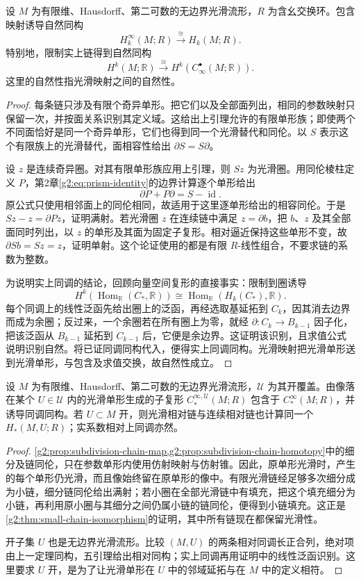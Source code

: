 \begin{theorem}\label{g2:thm:smooth-singular-comparison}
	设 \(M\) 为有限维、Hausdorff、第二可数的无边界光滑流形，\(R\) 为含幺交换环。包含映射诱导自然同构
	\[
		H_k^\infty(M;R)\xrightarrow{\ \cong\ }H_k(M;R).
	\]
	特别地，限制实上链得到自然同构
	\[
		H^k(M;\mathbb R)\xrightarrow{\ \cong\ }H^k(C_\infty^\bullet(M;\mathbb R)).
	\]
	这里的自然性指光滑映射之间的自然性。
\end{theorem}
\begin{proof}
	每条链只涉及有限个奇异单形。把它们以及全部面列出，相同的参数映射只保留一次，并按面关系识别其定义域。这给出上引理允许的有限单形族；即使两个不同面恰好是同一个奇异单形，它们也得到同一个光滑替代和同伦。以 \(S\) 表示这个有限族上的光滑替代，面相容性给出 \(\partial S=S\partial\)。

	设 \(z\) 是连续奇异圈。对其有限单形族应用上引理，则 \(Sz\) 为光滑圈。用同伦棱柱定义 \(P\)，第2章\cref{g2:eq:prism-identity}的边界计算逐个单形给出
	\[
		\partial P+P\partial=S-\operatorname{id}.
	\]
	原公式只使用相邻面上的同伦相同，故适用于这里逐单形给出的相容同伦。于是 \(Sz-z=\partial Pz\)，证明满射。若光滑圈 \(z\) 在连续链中满足 \(z=\partial b\)，把 \(b\)、\(z\) 及其全部面同时列出，以 \(z\) 的单形及其面为固定子复形。相对逼近保持这些单形不变，故 \(\partial Sb=Sz=z\)，证明单射。这个论证使用的都是有限 \(R\)-线性组合，不要求链的系数为整数。

	为说明实上同调的结论，回顾向量空间复形的直接事实：限制到圈诱导
	\[
		H^k(\operatorname{Hom}_{\mathbb R}(C_*,\mathbb R))
		\cong\operatorname{Hom}_{\mathbb R}(H_k(C_*),\mathbb R).
	\]
	每个同调上的线性泛函先给出圈上的泛函，再经选取基延拓到 \(C_k\)，因其消去边界而成为余圈；反过来，一个余圈若在所有圈上为零，就经 \(\partial:C_k\to B_{k-1}\) 因子化，把该泛函从 \(B_{k-1}\) 延拓到 \(C_{k-1}\) 后，它便是余边界。这证明该识别，且求值公式说明识别自然。将已证同调同构代入，便得实上同调同构。光滑映射把光滑单形送到光滑单形，与包含及求值交换，故自然性成立。
\end{proof}

\begin{corollary}\label{g2:cor:smooth-small-chains}
	设 \(M\) 为有限维、Hausdorff、第二可数的无边界光滑流形，\(\mathcal U\) 为其开覆盖。由像落在某个 \(U\in\mathcal U\) 内的光滑单形生成的子复形 \(C_*^{\infty,\mathcal U}(M;R)\) 包含于 \(C_*^\infty(M;R)\)，并诱导同调同构。若 \(U\subset M\) 开，则光滑相对链与连续相对链也计算同一个 \(H_*(M,U;R)\)；实系数相对上同调亦然。
\end{corollary}
\begin{proof}
	\cref{g2:prop:subdivision-chain-map,g2:prop:subdivision-chain-homotopy}中的细分及链同伦，只在参数单形内使用仿射映射与仿射锥。因此，原单形光滑时，产生的每个单形仍光滑，而且像始终留在原单形的像中。有限光滑链经足够多次细分成为小链，细分链同伦给出满射；若小圈在全部光滑链中有填充，把这个填充细分为小链，再利用原小圈与其细分之间仍属小链的链同伦，便得到小链填充。这正是\cref{g2:thm:small-chain-isomorphism}的证明，其中所有链现在都保留光滑性。

	开子集 \(U\) 也是无边界光滑流形。比较 \((M,U)\) 的两条相对同调长正合列，绝对项由上一定理同构，五引理给出相对同构；实上同调再用证明中的线性泛函识别。这里要求 \(U\) 开，是为了让光滑单形在 \(U\) 中的邻域延拓与在 \(M\) 中的定义相符。
\end{proof}

